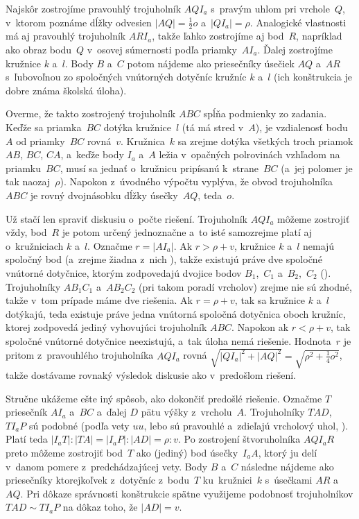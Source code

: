 {Najskôr zostrojíme pravouhlý trojuholník $AQI_a$ s~pravým uhlom pri
vrchole~$Q$, v~ktorom poznáme dĺžky odvesien $|AQ|= \frac12 {o}$
a~$|QI_a|= \rho$. Analogické vlastnosti má aj pravouhlý trojuholník
$ARI_a$, takže ľahko zostrojíme aj bod~$R$, napríklad ako
obraz bodu~$Q$ v~osovej súmernosti podľa priamky~$AI_a$.
Ďalej zostrojíme kružnice $k$ a~$l$.
Body $B$ a~$C$ potom nájdeme ako priesečníky úsečiek $AQ$
a~$AR$ s~ľubovoľnou zo spoločných vnútorných dotyčníc kružníc $k$ a~$l$
(ich konštrukcia je dobre známa školská úloha).

Overme, že takto zostrojený trojuholník $ABC$ spĺňa podmienky zo
zadania. Keďže sa priamka~$BC$ dotýka kružnice~$l$ (tá má stred v~$A$),
je vzdialenosť bodu~$A$ od priamky~$BC$ rovná~$v$. Kružnica~$k$ sa zrejme
dotýka všetkých troch priamok $AB$, $BC$, $CA$, a~keďže body
$I_a$ a~$A$ ležia v~opačných polrovinách vzhľadom na priamku~$BC$,
musí sa jednať o~kružnicu pripísanú k~strane~$BC$ (a~jej polomer je
tak naozaj~$\rho$). Napokon z~úvodného výpočtu vyplýva,
že obvod trojuholníka~$ABC$ je rovný dvojnásobku dĺžky úsečky~$AQ$, teda~$o$.

Už stačí len spraviť diskusiu o~počte riešení. Trojuholník
$AQI_a$ môžeme zostrojiť vždy,
bod~$R$ je potom určený jednoznačne a~to isté
samozrejme platí aj o~kružniciach $k$ a~$l$. Označme $r =|AI_a|$. Ak
$r>\rho+v$, kružnice $k$ a~$l$ nemajú spoločný bod (a~zrejme
žiadna z~nich ), takže existujú práve dve
spoločné vnútorné dotyčnice, ktorým zodpovedajú dvojice bodov
$B_1$,~$C_1$ a~$B_2$,~$C_2$ (\obr). Trojuholníky $AB_1C_1$ a~$AB_2C_2$
(pri takom poradí vrcholov)
zrejme nie sú zhodné, takže v~tom prípade máme dve riešenia. Ak
$r = \rho+v$, tak sa kružnice $k$ a~$l$ dotýkajú, teda existuje
práve jedna vnútorná spoločná dotyčnica oboch kružníc, ktorej
zodpovedá jediný vyhovujúci trojuholník $ABC$. Napokon ak
$r <\rho+v$, tak spoločné vnútorné dotyčnice neexistujú, a~tak úloha
nemá riešenie. Hodnota~$r$ je pritom z~pravouhlého
trojuholníka $AQI_a$ rovná
$\sqrt {|QI_a|^ 2+|AQ|^2} = \sqrt {\rho^2+\frac14 {o^2}}$, takže
dostávame rovnaký výsledok diskusie ako v~predošlom riešení.
%

\ineres
Stručne ukážeme ešte
iný spôsob, ako dokončiť predošlé riešenie.
Označme $T$ priesečník $AI_a$ a~$BC$ a~ďalej $D$
pätu výšky z~vrcholu~$A$. Trojuholníky $TAD$, $TI_aP$ sú
podobné (podľa vety $uu$, lebo sú pravouhlé a~zdieľajú
vrcholový uhol, \obr). Platí teda $|I_aT|:|TA|=|I_aP|:|AD|= \rho: v$.
%
Po zostrojení štvoruholníka $AQI_aR$ preto môžeme zostrojiť bod~$T$
ako (jediný) bod úsečky~$I_aA$, ktorý ju delí v~danom pomere
z~predchádzajúcej vety. Body
$B$ a~$C$ následne nájdeme ako priesečníky ktorejkoľvek z~dotyčníc z~bodu~$T$
ku~kružnici~$k$ s~úsečkami $AR$ a~$AQ$. Pri dôkaze správnosti
konštrukcie spätne využijeme podobnosť trojuholníkov $TAD\sim TI_aP$
na dôkaz toho, že $|AD|= v$.

}
